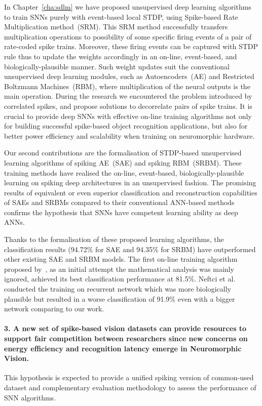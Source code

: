 In Chapter~\ref{cha:sdlm} we have proposed unsupervised deep learning algorithms to train SNNs purely with event-based local STDP, using Spike-based Rate Multiplication method~(SRM).
This SRM method successfully transfers multiplication operations to possibility of some specific firing events of a pair of rate-coded spike trains.
Moreover, these firing events can be captured with STDP rule thus to update the weights accordingly in an on-line, event-based, and biologically-plausible manner.
Such weight updates suit the conventional unsupervised deep learning modules, such as Autoencoders~(AE) and Restricted Boltzmann Machines~(RBM), where multiplication of the neural outputs is the main operation.
During the research we encountered the problem introduced by correlated spikes, and propose solutions to decorrelate pairs of spike trains.
It is crucial to provide deep SNNs with effective on-line training algorithms not only for building successful spike-based object recognition applications, but also for better power efficiency and scalability when training on neuromorphic hardware.

Our second contributions are the formalisation of STDP-based unsupervised learning algorithms of spiking AE~(SAE) and spiking RBM~(SRBM).
These training methods have realised the on-line, event-based, biologically-plausible learning on spiking deep architectures in an unsupervised fashion.
The promising results of equivalent or even superior classification and reconstruction capabilities of SAEs and SRBMs compared to their conventional ANN-based methods confirms the hypothesis that SNNs have competent learning ability as deep ANNs.

Thanks to the formalisation of these proposed learning algorithms, the classification results (94.72\% for SAE and 94.35\% for SRBM) have outperformed other existing SAE and SRBM models.
The first on-line training algorithm proposed by~\cite{neil2013online}, as an initial attempt the mathematical analysis was mainly ignored, achieved its best classification performance at 81.5\%.
Neftci et al.~\cite{neftci2013event} conducted the training on recurrent network which was more biologically plausible but resulted in a worse classification of 91.9\% even with a bigger network comparing to our work.

\paragraph{3. A new set of spike-based vision datasets can provide resources to support fair competition between researchers since new concerns on energy efficiency and recognition latency emerge in Neuromorphic Vision.}
This hypothesis is expected to provide a unified spiking version of common-used dataset and complementary evaluation methodology to assess the performance of SNN algorithms.

